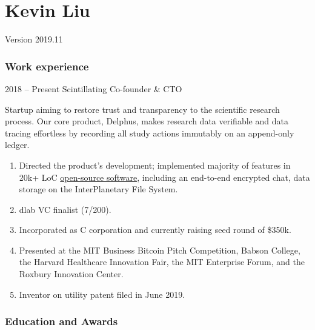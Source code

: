 \documentclass[paper=letter]{tccv}
\begin{document}
\part{Kevin Liu}


Version 2019.11

\section{Work experience}

\begin{eventlist}

\item{2018 -- Present}
     {Scintillating}
     {Co-founder \& CTO}

Startup aiming to restore trust and transparency to the scientific research process. Our core product, Delphus, makes research data verifiable and data tracing effortless by recording all study actions immutably on an append-only ledger.

\end{eventlist}

\vspace{-0.5cm}
\begin{enumerate}
     \item Directed the product's development; implemented majority of features in 20k+ LoC \href{https://gitlab.scintillating.us/scintillating/delphus}{open-source software}, including an end-to-end encrypted chat, data storage on the InterPlanetary File System.
     \item dlab VC finalist (7/200).
     \item Incorporated as C corporation and currently raising seed round of \$350k.
     \item Presented at the MIT Business Bitcoin Pitch Competition, Babson College, the Harvard Healthcare Innovation Fair, the MIT Enterprise Forum, and the Roxbury Innovation Center.
     \item Inventor on utility patent filed in June 2019.
\end{enumerate}

\section{Education and Awards}
\end{document}
